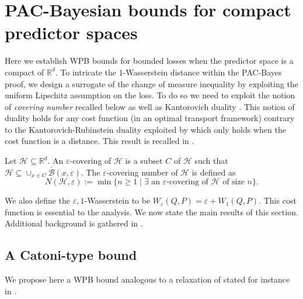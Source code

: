 \section{PAC-Bayesian bounds for compact predictor spaces}
\label{sec: compact_space}

Here we establish WPB bounds for bounded losses when the predictor space is a compact of $\mathbb{R}^d$. To intricate the $1$-Wasserstein distance within the PAC-Bayes proof, we design a surrogate of the change of measure inequality \citep{donsker1976asymp} by exploiting the uniform Lipschitz assumption on the loss. To do so we need to exploit the notion of \emph{covering number} recalled below as well as Kantorovich duality \citep[Theorem 5.10]{villani2009optimal}.
This notion of duality holds for any cost function (in an optimal transport framework) contrary to the Kantorovich-Rubinstein duality exploited by \citet{amit2022integral} which only holds when the cost function is a distance. This result is recalled in .
\begin{definition}
Let $\mathcal{H}\subseteq \mathbb{R}^d$. An $\varepsilon$-covering of $\mathcal{H}$ is a subset $C$ of $\mathcal{H}$ such that $\mathcal{H} \subseteq \cup_{x\in C} \bar{\mathcal{B}}(x,\varepsilon)$. The $\varepsilon$-covering number of $\mathcal{H}$ is defined as
$$N(\mathcal{H},\varepsilon):= \min\{n\geq 1 \mid \exists \text{ an $\varepsilon$-covering of $\mathcal{H}$ of size $n$} \}.$$
\end{definition}
We also define the $\varepsilon,1$-Wasserstein to be $W_{\varepsilon}(Q,P)= \varepsilon + W_1(Q,P)$. This cost function is essential to the analysis.
We now state the main results of this section. Additional background is gathered in .

\subsection{A Catoni-type bound}

We propose here a WPB bound analogous to a relaxation of \citet[Theorem 1.2.6]{catoni2007pac} stated for instance in \citet[Theorem 4.1]{alquier2016properties}.


